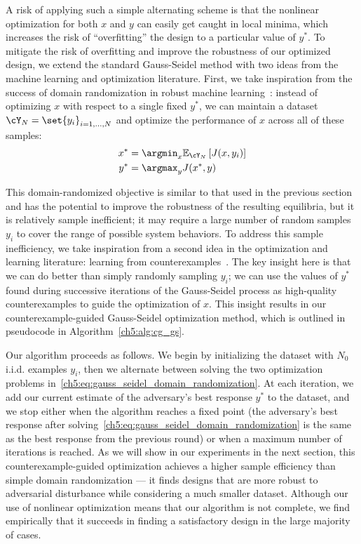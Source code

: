 A risk of applying such a simple alternating scheme is that the nonlinear optimization for both $x$ and $y$ can easily get caught in local minima, which increases the risk of ``overfitting'' the design to a particular value of $y^*$. To mitigate the risk of overfitting and improve the robustness of our optimized design, we extend the standard Gauss-Seidel method with two ideas from the machine learning and optimization literature. First, we take inspiration from the success of domain randomization in robust machine learning~\cite{tobinDomainRandomizationTransferring2017}: instead of optimizing $x$ with respect to a single fixed $y^*$, we can maintain a dataset $\cY_N = \set{y_i}_{i=1,\ldots,N}$ and optimize the performance of $x$ across all of these samples:
\begin{subequations}
    \begin{align}\label{ch5:eq:gauss_seidel_domain_randomization}
        x^* & = \argmin_x \mathbb{E}_{\cY_N} \left[ J(x, y_i) \right] \\
        y^* & = \argmax_y J(x^*, y)
    \end{align}
\end{subequations}

This domain-randomized objective is similar to that used in the previous section and has the potential to improve the robustness of the resulting equilibria, but it is relatively sample inefficient; it may require a large number of random samples $y_i$ to cover the range of possible system behaviors. To address this sample inefficiency, we take inspiration from a second idea in the optimization and learning literature: learning from counterexamples~\cite{changNeuralLyapunovControl2019}. The key insight here is that we can do better than simply randomly sampling $y_i$; we can use the values of $y^*$ found during successive iterations of the Gauss-Seidel process as high-quality counterexamples to guide the optimization of $x$. This insight results in our counterexample-guided Gauss-Seidel optimization method, which is outlined in pseudocode in Algorithm~\ref{ch5:alg:cg_gs}.

Our algorithm proceeds as follows. We begin by initializing the dataset with $N_0$ i.i.d. examples $y_i$, then we alternate between solving the two optimization problems in~\eqref{ch5:eq:gauss_seidel_domain_randomization}. At each iteration, we add our current estimate of the adversary's best response $y^*$ to the dataset, and we stop either when the algorithm reaches a fixed point (the adversary's best response after solving~\eqref{ch5:eq:gauss_seidel_domain_randomization} is the same as the best response from the previous round) or when a maximum number of iterations is reached. As we will show in our experiments in the next section, this counterexample-guided optimization achieves a higher sample efficiency than simple domain randomization ---  it finds designs that are more robust to adversarial disturbance while considering a much smaller dataset. Although our use of nonlinear optimization means that our algorithm is not complete, we find empirically that it succeeds in finding a satisfactory design in the large majority of cases.

